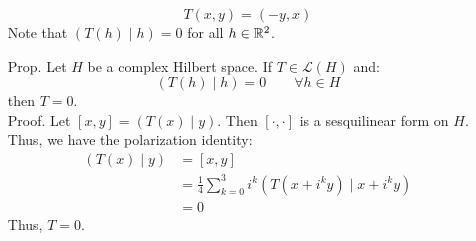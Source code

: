 \documentclass[12pt]{article}
\begin{document}
\begin{itemize}
    \[ T(x,y) = (-y, x)\]
    Note that $(T(h) \mid h) = 0$ for all $h \in \mathbb R^2$.
    \item[Prop.] Let $H$ be a complex Hilbert space. If $T \in \mathcal{L}(H)$ and: 
    \[ (T(h) \mid h) = 0 \qquad \forall h \in H\]
    then $T = 0$. \\
    Proof. Let $[x, y] = (T(x) \mid y)$. Then $[\cdot, \cdot]$ is a sesquilinear form on $H$. \\ 
    Thus, we have the polarization identity: 
    \begin{align*}
        (T(x) \mid y) &= [x, y] \\
        &= \frac 14 \sum_{k=0}^3 i^k (T(x + i^k y) \mid x + i^k y) \\
        &= 0
    \end{align*}
    Thus, $T = 0$. 
\end{itemize}
\end{document}
